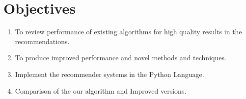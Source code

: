 \documentclass[12pt,a4paper]{article}
\begin{document}
	\section{Objectives}
	\begin{enumerate}
		\item{To review performance of existing algorithms for high quality results in the recommendations.}
		\item{To produce improved performance and novel methods and techniques.}
		\item{Implement the recommender systems in the Python Language.}
		\item{Comparison of the our algorithm and Improved versions.}
	\end{enumerate}
	\textbf{}\\



	
	 
	
	\newpage
	
	
	
\end{document}
